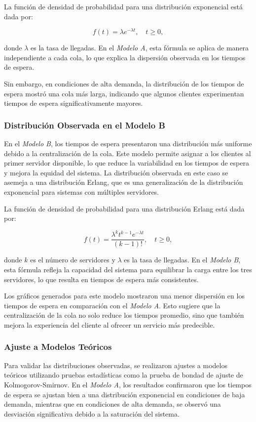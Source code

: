 \documentclass[a4paper,12pt]{article}
\begin{document}
La función de densidad de probabilidad para una distribución exponencial está dada por:

\[
f(t) = \lambda e^{-\lambda t}, \quad t \geq 0,
\]

donde \( \lambda \) es la tasa de llegadas. En el \textit{Modelo A}, esta fórmula se aplica de manera independiente a cada cola, lo que explica la dispersión observada en los tiempos de espera.

Sin embargo, en condiciones de alta demanda, la distribución de los tiempos de espera mostró una cola más larga, indicando que algunos clientes experimentan tiempos de espera significativamente mayores.

\subsubsection{Distribución Observada en el Modelo B}

En el \textit{Modelo B}, los tiempos de espera presentaron una distribución más uniforme debido a la centralización de la cola. Este modelo permite asignar a los clientes al primer servidor disponible, lo que reduce la variabilidad en los tiempos de espera y mejora la equidad del sistema. La distribución observada en este caso se asemeja a una distribución Erlang, que es una generalización de la distribución exponencial para sistemas con múltiples servidores.

La función de densidad de probabilidad para una distribución Erlang está dada por:

\[
f(t) = \frac{\lambda^k t^{k-1} e^{-\lambda t}}{(k-1)!}, \quad t \geq 0,
\]

donde \( k \) es el número de servidores y \( \lambda \) es la tasa de llegadas. En el \textit{Modelo B}, esta fórmula refleja la capacidad del sistema para equilibrar la carga entre los tres servidores, lo que resulta en tiempos de espera más consistentes.

Los gráficos generados para este modelo mostraron una menor dispersión en los tiempos de espera en comparación con el \textit{Modelo A}. Esto sugiere que la centralización de la cola no solo reduce los tiempos promedio, sino que también mejora la experiencia del cliente al ofrecer un servicio más predecible.

\subsubsection{Ajuste a Modelos Teóricos}

Para validar las distribuciones observadas, se realizaron ajustes a modelos teóricos utilizando pruebas estadísticas como la prueba de bondad de ajuste de Kolmogorov-Smirnov. En el \textit{Modelo A}, los resultados confirmaron que los tiempos de espera se ajustan bien a una distribución exponencial en condiciones de baja demanda, mientras que en condiciones de alta demanda, se observó una desviación significativa debido a la saturación del sistema.
\end{document}
